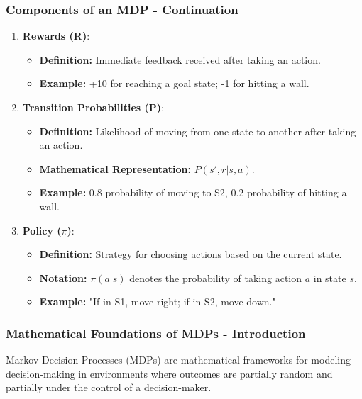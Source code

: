 \documentclass{beamer}
\begin{document}
\begin{frame}[fragile]
    \frametitle{Components of an MDP - Continuation}
    \begin{enumerate}[resume]
        \item \textbf{Rewards (R)}:
            \begin{itemize}
                \item \textbf{Definition:} Immediate feedback received after taking an action.
                \item \textbf{Example:} +10 for reaching a goal state; -1 for hitting a wall.
            \end{itemize}
        
        \item \textbf{Transition Probabilities (P)}:
            \begin{itemize}
                \item \textbf{Definition:} Likelihood of moving from one state to another after taking an action.
                \item \textbf{Mathematical Representation:} \( P(s', r | s, a) \).
                \item \textbf{Example:} 0.8 probability of moving to S2, 0.2 probability of hitting a wall.
            \end{itemize}

        \item \textbf{Policy ($\pi$)}:
            \begin{itemize}
                \item \textbf{Definition:} Strategy for choosing actions based on the current state.
                \item \textbf{Notation:} \( \pi(a | s) \) denotes the probability of taking action \( a \) in state \( s \).
                \item \textbf{Example:} "If in S1, move right; if in S2, move down."
            \end{itemize}
    \end{enumerate}
\end{frame}

\begin{frame}[fragile]
    \frametitle{Mathematical Foundations of MDPs - Introduction}
    Markov Decision Processes (MDPs) are mathematical frameworks for modeling decision-making in environments where outcomes are partially random and partially under the control of a decision-maker. 
\end{frame}
\end{document}
